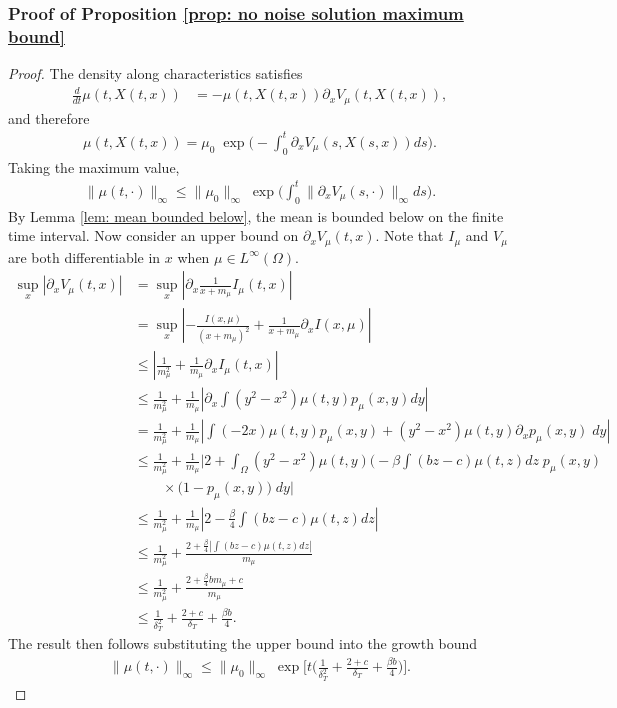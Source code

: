 \documentclass[10pt]{article}
\begin{document}
\subsubsection*{Proof of Proposition \ref{prop: no noise solution maximum bound}}
\begin{proof}
    The density along characteristics satisfies
    \begin{align*}
        \frac{d}{dt}\mu(t,X(t,x)) &= - \mu(t,X(t,x)) \partial_x V_\mu(t,X(t,x)),
    \end{align*}
    and therefore
    \begin{align*}
        \mu(t,X(t,x)) = \mu_0\; \exp\Big(-\int_0^t\partial_x V_\mu(s,X(s,x))ds \bigg).
    \end{align*}
    Taking the maximum value, 
    \begin{align*}
        \|\mu(t,\cdot)\|_\infty \leq \|\mu_0\|_\infty \; \exp\Big(\int_0^t \|\partial_x V_\mu(s,\cdot)\|_\infty ds \bigg).
    \end{align*}
    By Lemma \ref{lem: mean bounded below}, the mean is bounded below on the finite time interval. Now consider an upper bound on $\partial_xV_\mu(t,x)$. Note that $I_\mu$ and $V_\mu$ are both differentiable in $x$ when $\mu \in L^\infty(\Omega)$.
    \begin{align*}
        \sup_x |\partial_x V_\mu(t,x)| &= \sup_x|\partial_x \frac{1}{x+m_\mu}I_\mu(t,x)|\\
        &= \sup_x|-\frac{I(x,\mu)}{(x+m_\mu)^2} + \frac{1}{x+m_\mu}\partial_xI(x,\mu)|\\
        &\leq |\frac{1}{m_\mu^2} + \frac{1}{m_\mu}\partial_xI_\mu(t,x)|\\
        &\leq \frac{1}{m_\mu^2} + \frac{1}{m_\mu}|\partial_x\int(y^2-x^2)\mu(t,y)p_\mu(x,y)dy|\\
        & = \frac{1}{m_\mu^2} + \frac{1}{m_\mu}|\int(-2x)\mu(t,y)p_\mu(x,y) + (y^2-x^2)\mu(t,y)\partial_xp_\mu(x,y)\; dy|\\
        &\leq \frac{1}{m_\mu^2} + \frac{1}{m_\mu}|2 + \int_\Omega (y^2-x^2)\mu(t,y)\Big(-\beta \int(bz-c)\mu(t,z) dz\; p_\mu(x,y)\\&\qquad \times (1-p_\mu(x,y)\Big)\; dy|\\
        &\leq \frac{1}{m_\mu^2} + \frac{1}{m_\mu}|2 -\frac{\beta}{4} \int(bz-c)\mu(t,z)dz|\\
        &\leq \frac{1}{m_\mu^2} + \frac{2 + \frac{\beta}{4} |\int(bz-c)\mu(t,z)dz|}{m_\mu}\\
        &\leq \frac{1}{m_\mu^2} + \frac{2 + \frac{\beta}{4} b m_\mu + c}{m_\mu}\\
        &\leq \frac{1}{\delta_T^2} + \frac{2+c}{\delta_T} + \frac{\beta b}{4}.
    \end{align*}
    The result then follows substituting the upper bound into the growth bound
    \begin{align*}
        \|\mu(t,\cdot)\|_\infty \leq \|\mu_0\|_\infty \; \exp\bigg[t\big(\frac{1}{\delta_T^2} + \frac{2+c}{\delta_T} + \frac{\beta b}{4}\big)\bigg].
    \end{align*}
\end{proof}
\end{document}
